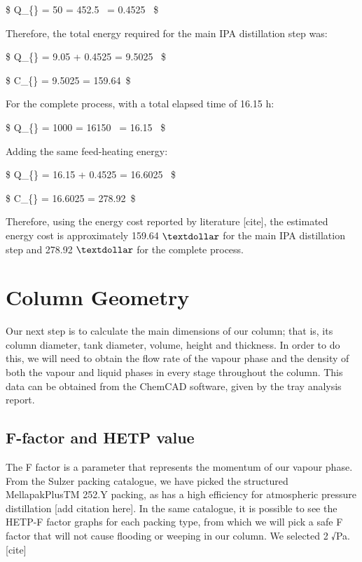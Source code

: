 \$ Q\_\{\} = 50  = 452.5~ =
0.4525~ \$

Therefore, the total energy required for the main IPA distillation step
was:

\$ Q\_\{\} = 9.05 + 0.4525 = 9.5025~ \$

\$ C\_\{\} = 9.5025  = 159.64~\textdollar \$

For the complete process, with a total elapsed time of 16.15 h:

\$ Q\_\{\} = 1000  = 16150~ =
16.15~ \$

Adding the same feed-heating energy:

\$ Q\_\{\} = 16.15 + 0.4525 = 16.6025~
\$

\$ C\_\{\} = 16.6025  = 278.92~\textdollar \$

Therefore, using the energy cost reported by literature {[}cite{]}, the
estimated energy cost is approximately 159.64 \(\textdollar\) for the
main IPA distillation step and 278.92 \(\textdollar\) for the complete
process.

\chapter{Column Geometry}\label{column-geometry}

Our next step is to calculate the main dimensions of our column; that
is, its column diameter, tank diameter, volume, height and thickness. In
order to do this, we will need to obtain the flow rate of the vapour
phase and the density of both the vapour and liquid phases in every
stage throughout the column. This data can be obtained from the ChemCAD
software, given by the tray analysis report.

\section{F-factor and HETP value}\label{f-factor-and-hetp-value}

The F factor is a parameter that represents the momentum of our vapour
phase. From the Sulzer packing catalogue, we have picked the structured
MellapakPlusTM 252.Y packing, as has a high efficiency for atmospheric
pressure distillation {[}add citation here{]}. In the same catalogue, it
is possible to see the HETP-F factor graphs for each packing type, from
which we will pick a safe F factor that will not cause flooding or
weeping in our column. We selected 2 √Pa. {[}cite{]}

